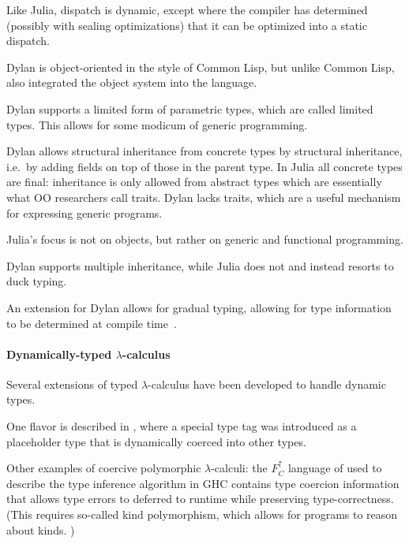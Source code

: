 Like Julia, dispatch is dynamic, except where the compiler has determined (possibly with sealing optimizations) that it can be optimized into a static dispatch.

Dylan is object-oriented in the style of Common Lisp, but unlike Common Lisp, also integrated the object system into the language.

Dylan supports a limited form of parametric types, which are called limited types.\cite{dylanman} This allows for some modicum of generic programming.

Dylan allows structural inheritance from concrete types by structural inheritance, i.e.\ by adding fields on top of those in the parent type. In Julia all concrete types are final: inheritance is only allowed from abstract types which are essentially what OO researchers call traits. Dylan lacks traits, which are a useful mechanism for expressing generic programs.

Julia's focus is not on objects, but rather on generic and functional programming.

Dylan supports multiple inheritance, while Julia does not and instead resorts to duck typing.

An extension for Dylan allows for gradual typing, allowing for type information to be determined at compile time~\cite{Mehnert2010}.

\paragraph{Dynamically-typed $\lambda$-calculus}

Several extensions of typed $\lambda$-calculus have been developed to handle dynamic types.

One flavor is described in \cite{Henglein1994}, where a special type tag 
was introduced as a placeholder type that is dynamically coerced into other
types. %

Other examples of coercive polymorphic $\lambda$-calculi: the $F^\uparrow_C$ language of \cite{Vytiniotis2012,Yorgey2012} used to describe the type inference algorithm in GHC \cite{Weirich2011} contains type coercion information that allows type errors to deferred to runtime \cite{Vytiniotis2012} while preserving type-correctness. (This requires so-called kind polymorphism, which allows for programs to reason about kinds. \cite{Yorgey2012})


